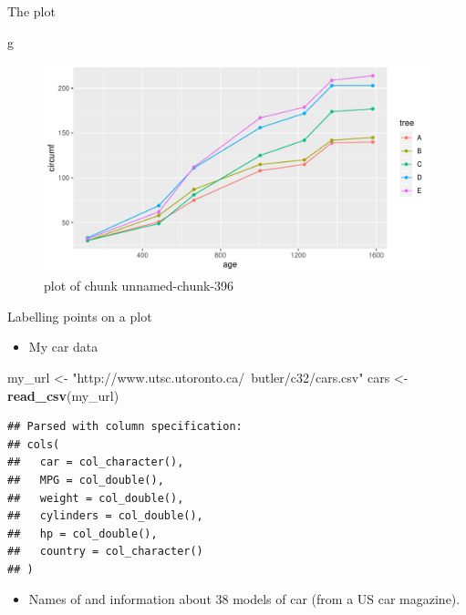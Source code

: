 \documentclass[
  ignorenonframetext,
]{beamer}
\newenvironment{Shaded}{\begin{snugshade}}{\end{snugshade}}
\newcommand{\KeywordTok}[1]{\textcolor[rgb]{0.13,0.29,0.53}{\textbf{#1}}}
\newcommand{\NormalTok}[1]{#1}
\newcommand{\StringTok}[1]{\textcolor[rgb]{0.31,0.60,0.02}{#1}}
\providecommand{\tightlist}{%
  \setlength{\itemsep}{0pt}\setlength{\parskip}{0pt}}
\begin{document}
\begin{frame}[fragile]{The plot}
\protect\hypertarget{the-plot-4}{}

\begin{Shaded}
\begin{Highlighting}[]
\NormalTok{g}
\end{Highlighting}
\end{Shaded}

\begin{figure}
\centering
\includegraphics{figure/unnamed-chunk-396-1.pdf}
\caption{plot of chunk unnamed-chunk-396}
\end{figure}

\end{frame}

\begin{frame}[fragile]{Labelling points on a plot}
\protect\hypertarget{labelling-points-on-a-plot}{}

\begin{itemize}
\tightlist
\item
  My car data
\end{itemize}

\begin{Shaded}
\begin{Highlighting}[]
\NormalTok{my_url <-}\StringTok{ "http://www.utsc.utoronto.ca/~butler/c32/cars.csv"}
\NormalTok{cars <-}\StringTok{ }\KeywordTok{read_csv}\NormalTok{(my_url)}
\end{Highlighting}
\end{Shaded}

\begin{verbatim}
## Parsed with column specification:
## cols(
##   car = col_character(),
##   MPG = col_double(),
##   weight = col_double(),
##   cylinders = col_double(),
##   hp = col_double(),
##   country = col_character()
## )
\end{verbatim}

\begin{itemize}
\tightlist
\item
  Names of and information about 38 models of car (from a US car
  magazine).
\end{itemize}

\end{frame}
\end{document}
